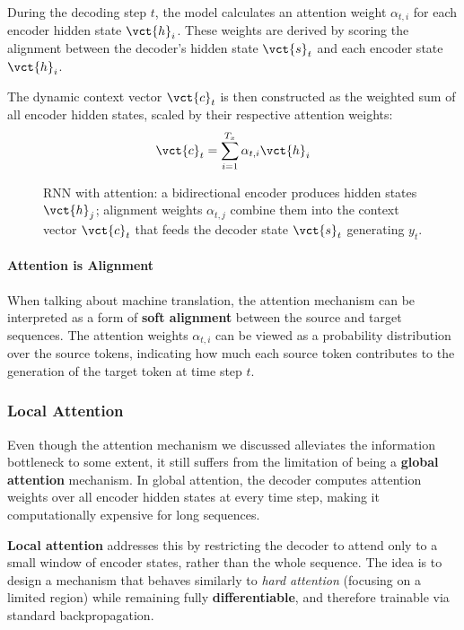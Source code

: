 During the decoding step $t$, the model calculates an attention weight $\alpha_{t,i}$ for each encoder hidden state $\vct{h}_i$.
These weights are derived by scoring the alignment between the decoder's hidden state $\vct{s}_t$ and each encoder state $\vct{h}_i$.

The dynamic context vector $\vct{c}_t$ is then constructed as the weighted sum of all encoder hidden states, scaled by their respective attention weights:
\[
\vct{c}_t = \sum_{i=1}^{T_x} \alpha_{t,i} \vct{h}_i
\]

\begin{figure}[H]
    \centering
    
    \caption{RNN with attention: a bidirectional encoder produces hidden states $\vct{h}_j$; alignment weights $\alpha_{t,j}$ combine them into the context vector $\vct{c}_t$ that feeds the decoder state $\vct{s}_t$ generating $y_t$.}
\end{figure}

\paragraph{Attention is Alignment}
When talking about machine translation, the attention mechanism can be interpreted as a form of \textbf{soft alignment} between the source and target sequences.
The attention weights $\alpha_{t,i}$ can be viewed as a probability distribution over the source tokens, indicating how much each source token contributes to the generation of the target token at time step $t$.

\subsubsection{Local Attention}
Even though the attention mechanism we discussed alleviates the information bottleneck to some extent, it still suffers from the limitation of being a \textbf{global attention} mechanism.
In global attention, the decoder computes attention weights over all encoder hidden states at every time step, making it computationally expensive for long sequences.

\textbf{Local attention} addresses this by restricting the decoder to attend only to a small window of encoder states, rather than the whole sequence.
The idea is to design a mechanism that behaves similarly to \textit{hard attention} (focusing on a limited region) while remaining fully \textbf{differentiable}, and therefore trainable via standard backpropagation.

